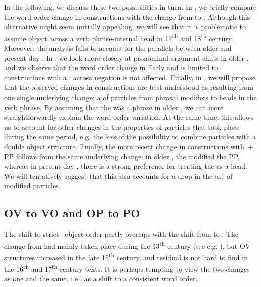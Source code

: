 \documentclass[output=paper]{langscibook}
\begin{document}
In the following, we discuss these two possibilities in turn. In , we briefly compare the word order change in  constructions with the change from  to . Although this alternative might seem initially appealing, we will see that it is problematic to assume object  across a verb phrase-internal head in 17\textsuperscript{th} and 18\textsuperscript{th} century . Moreover, the analysis fails to account for the parallels between older  and present-day . In , we look more closely at pronominal argument shifts in older , and we observe that the word order change in Early and  is limited to constructions with a :  across negation is not affected. Finally, in , we will propose that the observed changes in  constructions are best understood as resulting from one single underlying change: a  of particles from phrasal modifiers to heads in the verb phrase. By assuming that the  was a phrase in older , we can more straightforwardly explain the word order variation. At the same time, this allows us to account for other changes in the properties of particles that took place during the same period, e.g. the loss of the possibility to combine  particles with a double object structure. Finally, the more recent change in constructions with \,+\,PP follows from the same underlying change: in older , the  modified the PP, whereas in present-day , there is a strong preference for treating the  as a head. We will tentatively suggest that this also accounts for a drop in the use of modified particles.


\subsection{OV to VO and OP to PO}\label{sec:lalu:6.1}

The shift to strict –object order partly overlaps with the shift from  to . The change from  had mainly taken place during the 13\textsuperscript{th} century (see e.g. \citealt{Delsing1999}), but OV structures increased in the late 15\textsuperscript{th} century, and residual  is not hard to find in the 16\textsuperscript{th} and 17\textsuperscript{th} century texts. It is perhaps tempting to view the two changes as one and the same, i.e., as a shift to a consistent  word order. 
\end{document}
